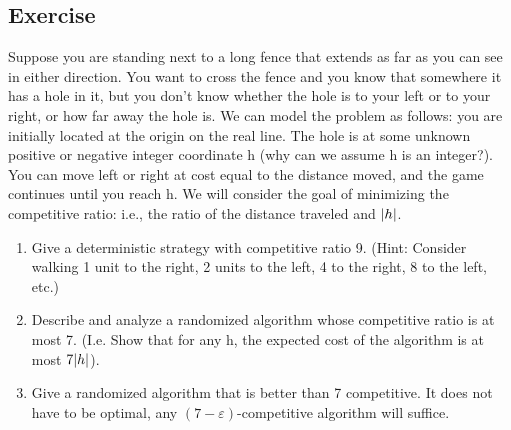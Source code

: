 \documentclass{article}
\newcounter{counter}
\newcommand{\Exercise}{Exercise \stepcounter{counter}\thecounter}
\DeclarePairedDelimiter\abs{\lvert}{\rvert}%
\begin{document}
\subsection*{\Exercise}
    Suppose you are standing next to a long fence that extends as far as you can see in either direction. You want to cross the fence and you know that somewhere it has a hole in it, but you don't know whether the hole is to your left or to your right, or how far away the hole is. We can model the problem as follows: you are initially located at the origin on the real line. The hole is at some unknown positive or negative integer coordinate h (why can we assume h is an integer?). You can move left or right at cost equal to the distance moved, and the game continues until you reach h. We will consider the goal of minimizing the competitive ratio: i.e., the ratio of the distance traveled and $\abs{h}$.
    \begin{enumerate}
        \item Give a deterministic strategy with competitive ratio 9. (Hint: Consider walking 1 unit to the right, 2 units to the left, 4 to the right, 8 to the left, etc.)
        \item Describe and analyze a randomized algorithm whose competitive ratio is at most 7. (I.e. Show that for any h, the expected cost of the algorithm is at most $7\abs{h}$).
        \item  Give a randomized algorithm that is better than 7 competitive. It does not have to be optimal, any $(7-\varepsilon)$-competitive algorithm will suffice.
    \end{enumerate}
\end{document}
